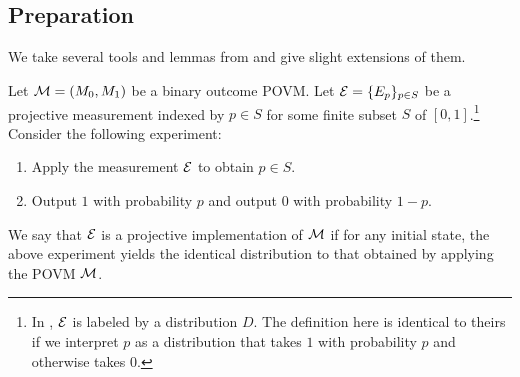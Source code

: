 \begin{lemma}
\end{lemma}

\subsection{Preparation}
We take several tools and lemmas from \cite{TCC:Zhandry20,FOCS:CMSZ21} and give slight extensions of them.   
\begin{definition}
Let $\mathcal{M}=(M_0,M_1)$ be a binary outcome POVM. Let $\mathcal{E}=\{E_p\}_{p\in S}$ be a projective measurement indexed by $p\in S$ for some finite subset $S$ of $[0,1]$.\footnote{In \cite{TCC:Zhandry20}, $\mathcal{E}$ is labeled by a distribution $D$. The definition here is identical to theirs if we interpret $p$ as a distribution that takes $1$ with probability $p$ and otherwise takes $0$.} Consider the following experiment:
\begin{enumerate}
\item Apply the measurement $\mathcal{E}$ to obtain $p\in S$. 
\item Output $1$ with probability $p$ and output $0$ with probability $1-p$.  
\end{enumerate}
We say that $\mathcal{E}$ is a projective implementation of $\mathcal{M}$ if for any initial state, the above experiment yields the identical distribution to that obtained by applying the POVM $\mathcal{M}$.  
\end{definition}

